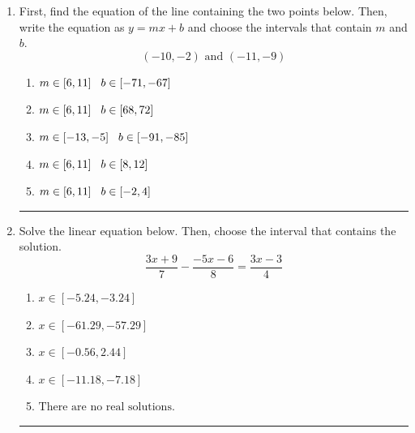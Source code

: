 \documentclass[14pt]{extbook}
\newcommand{\litem}[1]{\item#1\hspace*{-1cm}\rule{\textwidth}{0.4pt}}
\begin{document}
\begin{enumerate}
{\begin{enumerate}[label=\Alph*.]
\end{enumerate} }
\litem{
First, find the equation of the line containing the two points below. Then, write the equation as $ y=mx+b $ and choose the intervals that contain $m$ and $b$.\[ (-10, -2) \text{ and } (-11, -9) \]\begin{enumerate}[label=\Alph*.]
\item \( m \in [6, 11] \hspace*{3mm} b \in [-71, -67] \)
\item \( m \in [6, 11] \hspace*{3mm} b \in [68, 72] \)
\item \( m \in [-13, -5] \hspace*{3mm} b \in [-91, -85] \)
\item \( m \in [6, 11] \hspace*{3mm} b \in [8, 12] \)
\item \( m \in [6, 11] \hspace*{3mm} b \in [-2, 4] \)

\end{enumerate} }
\litem{
Solve the linear equation below. Then, choose the interval that contains the solution.\[ \frac{3x + 9}{7} - \frac{-5x -6}{8} = \frac{3x -3}{4} \]\begin{enumerate}[label=\Alph*.]
\item \( x \in [-5.24, -3.24] \)
\item \( x \in [-61.29, -57.29] \)
\item \( x \in [-0.56, 2.44] \)
\item \( x \in [-11.18, -7.18] \)
\item \( \text{There are no real solutions.} \)


\end{enumerate}}
\end{enumerate}
\end{document}
